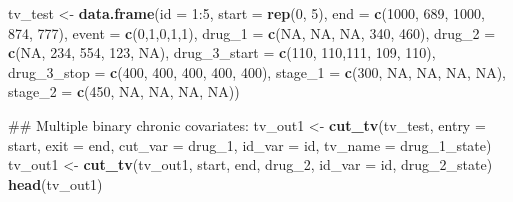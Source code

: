 \documentclass[]{article}
\newenvironment{Shaded}{\begin{snugshade}}{\end{snugshade}}
\newcommand{\KeywordTok}[1]{\textcolor[rgb]{0.13,0.29,0.53}{\textbf{{#1}}}}
\newcommand{\DataTypeTok}[1]{\textcolor[rgb]{0.13,0.29,0.53}{{#1}}}
\newcommand{\DecValTok}[1]{\textcolor[rgb]{0.00,0.00,0.81}{{#1}}}
\newcommand{\StringTok}[1]{\textcolor[rgb]{0.31,0.60,0.02}{{#1}}}
\newcommand{\OtherTok}[1]{\textcolor[rgb]{0.56,0.35,0.01}{{#1}}}
\newcommand{\NormalTok}[1]{{#1}}
\begin{document}
\begin{Shaded}
\begin{Highlighting}[]
\NormalTok{tv_test <-}\StringTok{ }\KeywordTok{data.frame}\NormalTok{(}\DataTypeTok{id =} \DecValTok{1}\NormalTok{:}\DecValTok{5}\NormalTok{, }\DataTypeTok{start =} \KeywordTok{rep}\NormalTok{(}\DecValTok{0}\NormalTok{, }\DecValTok{5}\NormalTok{), }\DataTypeTok{end =} \KeywordTok{c}\NormalTok{(}\DecValTok{1000}\NormalTok{, }\DecValTok{689}\NormalTok{, }\DecValTok{1000}\NormalTok{, }\DecValTok{874}\NormalTok{, }\DecValTok{777}\NormalTok{), }
                   \DataTypeTok{event =} \KeywordTok{c}\NormalTok{(}\DecValTok{0}\NormalTok{,}\DecValTok{1}\NormalTok{,}\DecValTok{0}\NormalTok{,}\DecValTok{1}\NormalTok{,}\DecValTok{1}\NormalTok{), }\DataTypeTok{drug_1 =} \KeywordTok{c}\NormalTok{(}\OtherTok{NA}\NormalTok{, }\OtherTok{NA}\NormalTok{, }\OtherTok{NA}\NormalTok{, }\DecValTok{340}\NormalTok{, }\DecValTok{460}\NormalTok{),}
                   \DataTypeTok{drug_2 =} \KeywordTok{c}\NormalTok{(}\OtherTok{NA}\NormalTok{, }\DecValTok{234}\NormalTok{, }\DecValTok{554}\NormalTok{, }\DecValTok{123}\NormalTok{, }\OtherTok{NA}\NormalTok{), }
                   \DataTypeTok{drug_3_start =} \KeywordTok{c}\NormalTok{(}\DecValTok{110}\NormalTok{, }\DecValTok{110}\NormalTok{,}\DecValTok{111}\NormalTok{, }\DecValTok{109}\NormalTok{, }\DecValTok{110}\NormalTok{),}
                   \DataTypeTok{drug_3_stop =} \KeywordTok{c}\NormalTok{(}\DecValTok{400}\NormalTok{, }\DecValTok{400}\NormalTok{, }\DecValTok{400}\NormalTok{, }\DecValTok{400}\NormalTok{, }\DecValTok{400}\NormalTok{),}
                   \DataTypeTok{stage_1 =} \KeywordTok{c}\NormalTok{(}\DecValTok{300}\NormalTok{, }\OtherTok{NA}\NormalTok{, }\OtherTok{NA}\NormalTok{, }\OtherTok{NA}\NormalTok{, }\OtherTok{NA}\NormalTok{),}
                      \DataTypeTok{stage_2 =} \KeywordTok{c}\NormalTok{(}\DecValTok{450}\NormalTok{, }\OtherTok{NA}\NormalTok{, }\OtherTok{NA}\NormalTok{, }\OtherTok{NA}\NormalTok{, }\OtherTok{NA}\NormalTok{))}

\NormalTok{## Multiple binary chronic covariates:}
\NormalTok{tv_out1 <-}\StringTok{ }\KeywordTok{cut_tv}\NormalTok{(tv_test, }
                  \DataTypeTok{entry =} \NormalTok{start, }
                  \DataTypeTok{exit =}  \NormalTok{end, }
                  \DataTypeTok{cut_var =} \NormalTok{drug_1, }
                  \DataTypeTok{id_var =} \NormalTok{id, }
                  \DataTypeTok{tv_name =} \NormalTok{drug_1_state)}
\NormalTok{tv_out1 <-}\StringTok{ }\KeywordTok{cut_tv}\NormalTok{(tv_out1, start, end, drug_2, }\DataTypeTok{id_var =} \NormalTok{id, drug_2_state)}
\KeywordTok{head}\NormalTok{(tv_out1)}
\end{Highlighting}
\end{Shaded}
\end{document}
